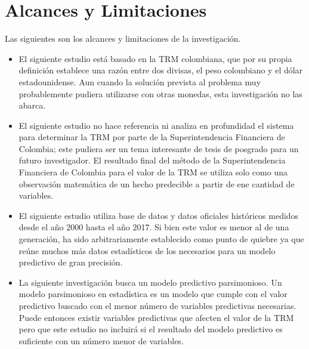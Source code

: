 \section{Alcances y Limitaciones}
Las siguientes son los alcances y limitaciones de la investigación. 

\begin{itemize}
	\item El siguiente estudio está basado en la TRM colombiana, que por su propia definición establece una razón entre dos divisas, el peso colombiano y el dólar estadounidense. Aun cuando la solución prevista al problema muy probablemente pudiera utilizarse con otras monedas, esta investigación no las abarca.
	\item El siguiente estudio no hace referencia ni analiza en profundidad el sistema para determinar la TRM por parte de la Superintendencia Financiera de Colombia; este pudiera ser un tema interesante de tesis de posgrado para un futuro investigador. El resultado final del método de la Superintendencia Financiera de Colombia para el valor de la TRM se utiliza solo como una observación matemática de un hecho predecible a partir de ene cantidad de variables. 
	\item El siguiente estudio utiliza base de datos y datos oficiales históricos medidos desde el año 2000 hasta el año 2017. Si bien este valor es menor al de una generación, ha sido arbitrariamente establecido como punto de quiebre ya que reúne muchos más datos estadísticos de los necesarios para un modelo predictivo de gran precisión. 
	\item La siguiente investigación busca un modelo predictivo parsimonioso. Un modelo parsimonioso en estadística es un modelo que cumple con el valor predictivo buscado con el menor número de variables predictivas necesarias. Puede entonces existir variables predictivas que afecten el valor de la TRM pero que este estudio no incluirá si el resultado del modelo predictivo es suficiente con un número menor de variables.
\end{itemize} 
